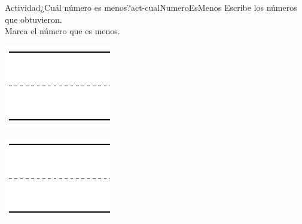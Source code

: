 \documentclass[20pt]{extarticle}
\begin{document}
\begin{activity}{Actividad}{¿Cuál número es menos?}{act-cualNumeroEsMenos}
Escribe los números que obtuvieron.\\
 Marca el número que es menos.%
\begin{sidebyside}{2}{0.1}{0.1}{0.2}%
\begin{sbspanel}{0.3}%
\includegraphics[max width=\linewidth, center]{external/svg-source/tikz-file-148545.pdf}
\end{sbspanel}%
\begin{sbspanel}{0.3}%
\includegraphics[max width=\linewidth, center]{external/svg-source/tikz-file-148545.pdf}
\end{sbspanel}%
\end{sidebyside}%
\vspace{1cm}
\begin{sidebyside}{2}{0.1}{0.1}{0.2}%

\end{sidebyside}
\end{activity}
\end{document}
